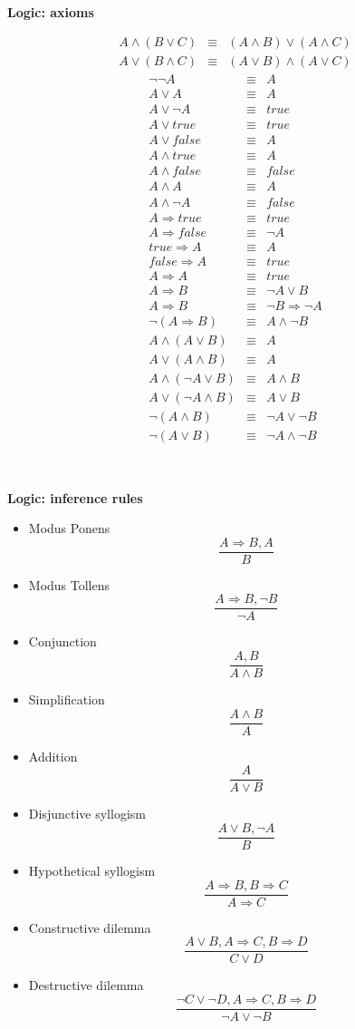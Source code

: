 \documentclass{article}
\newcommand{\bi}{\begin{itemize}}
\newcommand{\ii}{\item}
\newcommand{\ei}{\end{itemize}}
\newcommand{\ti}[1]{
\mbox{~}

\vspace{1.25in}
\centerline{\bf #1}}
\begin{document}
\newpage

\ti{Logic: axioms}
\LARGE
\newcommand{\eq}{&\equiv&}
\newcommand{\imp}{\Rightarrow}

\begin{multicols}{2}
\begin{eqnarray*}
A\land(B\lor C) \eq  (A\land B) \lor (A \land C)\\
A\lor(B\land C) \eq  (A\lor B) \land (A \lor C)
\end{eqnarray*}
\begin{eqnarray*}
\neg \neg A \eq A\\
A\lor A \eq A\\
A\lor \neg A \eq true\\
A\lor true \eq true\\
A\lor false \eq A\\
A\land true \eq A\\
A\land false \eq false\\
A\land A \eq A\\
A\land \neg A \eq false\\
A\imp true \eq true\\
A\imp false \eq \neg A\\
true\imp A \eq A\\
false \imp A \eq true\\
A\imp A \eq true\\
A\imp B \eq \neg A \lor B\\
A\imp B \eq \neg B \imp \neg A\\
\neg(A\imp B) \eq A \land \neg B\\
A\land(A\lor B) \eq A\\
A\lor(A\land B) \eq A\\
A\land(\neg A \lor B) \eq A \land B\\
A \lor (\neg A \land B) \eq A \lor B\\
\neg(A\land B) \eq \neg A \lor \neg B\\
\neg(A\lor B) \eq \neg A \land \neg B
\end{eqnarray*}

\end{multicols}
\huge

\newpage
\ti{Logic: inference rules}
\begin{multicols}{2}
\bi
\ii Modus Ponens
\[
\frac{A\imp B, A}{B}
\]
\ii Modus Tollens
\[
\frac{A\imp B, \neg B}{\neg A}
\]
\ii Conjunction
\[
\frac{A,B}{A\land B}
\]
\ii Simplification
\[
\frac{A\land B}{A}
\]
\ii Addition
\[
\frac{A}{A\lor B}
\]
\ii Disjunctive syllogism
\[
\frac{A\lor B, \neg A}{B}
\]
\ii Hypothetical syllogism
\[
\frac{A\imp B, B\imp C}{A\imp C}
\]
\ii Constructive dilemma
\[
\frac{A\lor B, A\imp C, B\imp D}{C\lor D}
\]
\ii Destructive dilemma
\[
\frac{\neg C\lor \neg D, A\imp C, B\imp D}{\neg A \lor \neg B}
\]
\ei
\end{multicols}
\end{document}
